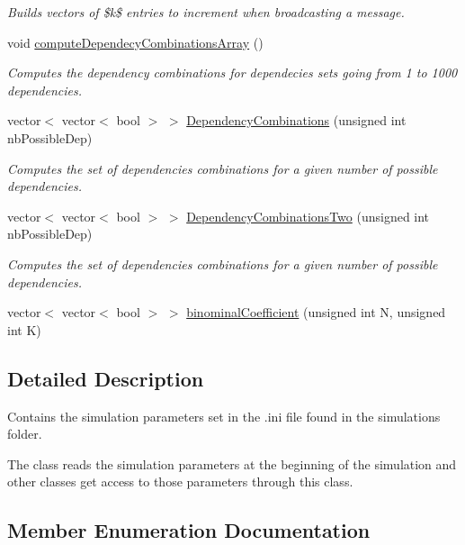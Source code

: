\begin{DoxyCompactItemize}
\begin{DoxyCompactList}\small\item\em Builds vectors of \$k\$ entries to increment when broadcasting a message. \end{DoxyCompactList}\item 
void \hyperlink{class_simulation_parameters_a09bec9dc793646bd71f610eee824dc21}{compute\+Dependecy\+Combinations\+Array} ()
\begin{DoxyCompactList}\small\item\em Computes the dependency combinations for dependecies sets going from 1 to 1000 dependencies. \end{DoxyCompactList}\item 
vector$<$ vector$<$ bool $>$ $>$ \hyperlink{class_simulation_parameters_a9694dd5f7c2028efe03dc273d8fdcbd7}{Dependency\+Combinations} (unsigned int nb\+Possible\+Dep)
\begin{DoxyCompactList}\small\item\em Computes the set of dependencies combinations for a given number of possible dependencies. \end{DoxyCompactList}\item 
vector$<$ vector$<$ bool $>$ $>$ \hyperlink{class_simulation_parameters_a4e6bb792e1487214e5cf1d64c8841064}{Dependency\+Combinations\+Two} (unsigned int nb\+Possible\+Dep)
\begin{DoxyCompactList}\small\item\em Computes the set of dependencies combinations for a given number of possible dependencies. \end{DoxyCompactList}\item 
vector$<$ vector$<$ bool $>$ $>$ \hyperlink{class_simulation_parameters_ab0615d3df4a78df81566d219e6e9529f}{binominal\+Coefficient} (unsigned int N, unsigned int K)
\end{DoxyCompactItemize}


\subsection{Detailed Description}
Contains the simulation parameters set in the .ini file found in the simulations folder. 

The class reads the simulation parameters at the beginning of the simulation and other classes get access to those parameters through this class. 

\subsection{Member Enumeration Documentation}
\mbox{\label{class_simulation_parameters_ae08444273809241f502aa422205f7307}} 
